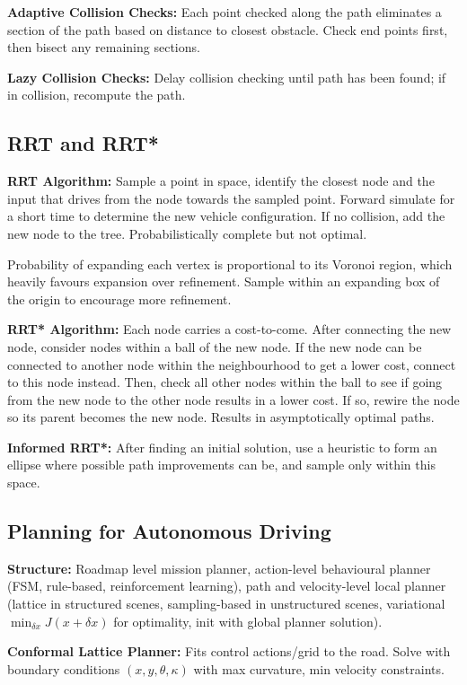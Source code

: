 \documentclass[twocolumn, 8pt]{extarticle}
\begin{document}
\textbf{Adaptive Collision Checks:} Each point checked along the path eliminates a section of the path based on distance
to closest obstacle. Check end points first, then bisect any remaining sections.

\textbf{Lazy Collision Checks:} Delay collision checking until path has been found; if in collision, recompute the path.

\subsection{RRT and RRT*}

\textbf{RRT Algorithm:} Sample a point in space, identify the closest node and the input that drives from the node
towards the sampled point. Forward simulate for a short time to determine the new vehicle configuration. If no
collision, add the new node to the tree. Probabilistically complete but not optimal.

Probability of expanding each vertex is proportional to its Voronoi region, which heavily favours expansion over
refinement. Sample within an expanding box of the origin to encourage more refinement.

\textbf{RRT* Algorithm:} Each node carries a cost-to-come. After connecting the new node, consider nodes within a ball
of the new node. If the new node can be connected to another node within the neighbourhood to get a lower cost, connect
to this node instead. Then, check all other nodes within the ball to see if going from the new node to the other node
results in a lower cost. If so, rewire the node so its parent becomes the new node. Results in asymptotically optimal
paths.

\textbf{Informed RRT*:} After finding an initial solution, use a heuristic to form an ellipse where possible path
improvements can be, and sample only within this space.

\subsection{Planning for Autonomous Driving}

\textbf{Structure:} Roadmap level mission planner, action-level behavioural planner (FSM, rule-based, reinforcement
learning), path and velocity-level local planner (lattice in structured scenes, sampling-based in unstructured scenes,
variational \(\min _{\delta x} J(x + \delta x)\) for optimality, init with global planner solution).

\textbf{Conformal Lattice Planner:} Fits control actions/grid to the road. Solve with boundary conditions \((x, y,
\theta, \kappa)\) with max curvature, min velocity constraints.
\end{document}
